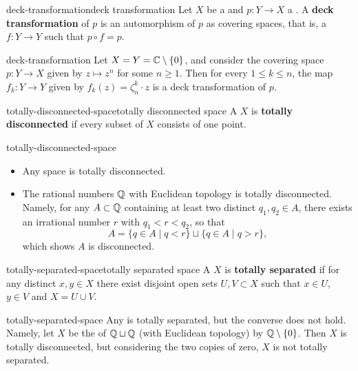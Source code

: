 \begin{topic}{deck-transformation}{deck transformation}
    Let $X$ be a  and $p : Y \to X$ a . A \textbf{deck transformation} of $p$ is an automorphism of $p$ as covering spaces, that is, a  $f : Y \to Y$ such that $p \circ f = p$.
\end{topic}

\begin{example}{deck-transformation}
    Let $X = Y = \mathbb{C} \setminus \{ 0 \}$, and consider the covering space $p : Y \to X$ given by $z \mapsto z^n$ for some $n \ge 1$. Then for every $1 \le k \le n$, the map $f_k : Y \to Y$ given by $f_k(z) = \zeta_n^k \cdot z$ is a deck transformation of $p$.
\end{example}

\begin{topic}{totally-disconnected-space}{totally disconnected space}
    A  $X$ is \textbf{totally disconnected} if every  subset of $X$ consists of one point.
\end{topic}

\begin{example}{totally-disconnected-space}
    \begin{itemize}
        \item Any  space is totally disconnected.
        \item The rational numbers $\mathbb{Q}$ with Euclidean topology is totally disconnected. Namely, for any $A \subset \mathbb{Q}$ containing at least two distinct $q_1, q_2 \in A$, there exists an irrational number $r$ with $q_1 < r < q_2$, so that
        \[ A = \{ q \in A \mid q < r \} \sqcup \{ q \in A \mid q > r \} , \]
        which shows $A$ is disconnected.
    \end{itemize}
\end{example}

\begin{topic}{totally-separated-space}{totally separated space}
    A  $X$ is \textbf{totally separated} if for any distinct $x, y \in X$ there exist disjoint open sets $U, V \subset X$ such that $x \in U$, $y \in V$ and $X = U \cup V$.
\end{topic}

\begin{example}{totally-separated-space}
    Any  is totally separated, but the converse does not hold. Namely, let $X$ be the  of $\mathbb{Q} \sqcup \mathbb{Q}$ (with Euclidean topology) by $\mathbb{Q} \setminus \{ 0 \}$. Then $X$ is totally disconnected, but considering the two copies of zero, $X$ is not totally separated.
\end{example}

